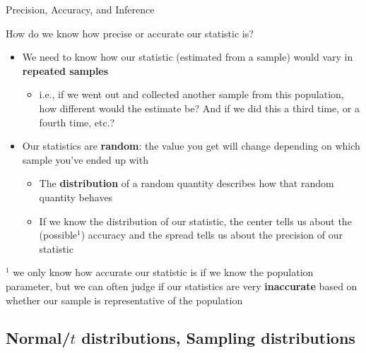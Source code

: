 \documentclass[10pt,t]{beamer}
\begin{document}
\begin{frame}{Precision, Accuracy, and Inference}
	
\vspace{-3 mm}
	
	
How do we know how precise or accurate our statistic is?

\vspace{0.1cm}

\begin{itemize}
	\item We need to know how our statistic (estimated from a sample) would vary in \textbf{repeated samples}
	\begin{itemize}
		\smallskip
		\item i.e., if we went out and collected another sample from this population, how different would the estimate be? And if we did this a third time, or a fourth time, etc.?
	\end{itemize}
\medskip
	\item Our statistics are \textbf{random}: the value you get will change depending on which sample you've ended up with
	\begin{itemize}
		\smallskip
		\item The \textbf{distribution} of a random quantity describes how that random quantity behaves
		\smallskip
		\item If we know the distribution of our statistic, the center tells us about the (possible${}^1$) accuracy and the spread tells us about the precision of our statistic
	\end{itemize}
\end{itemize}

\vspace{0.1cm}

\small ${}^1$ we only know how accurate our statistic is if we know the population parameter, but we can often judge if our statistics are very \textbf{inaccurate} based on whether our sample is representative of the population

\end{frame}

\subsection{Normal/$t$ distributions, Sampling distributions}
\end{document}
